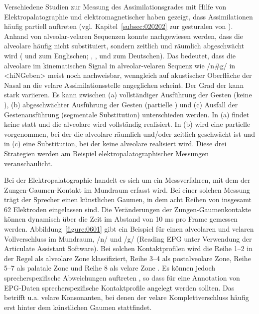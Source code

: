 Verschiedene Studien zur Messung des Assimilationsgrades mit Hilfe von Elektropalatographie und elektromagnetischer  haben gezeigt, dass Assimilationen häufig partiell auftreten (vgl. Kapitel~\ref{subsec:020202} zur gesturalen  von ). Anhand von alveolar-velaren Sequenzen konnte nachgewiesen werden, dass die alveolare  häufig nicht substituiert, sondern zeitlich und räumlich abgeschwächt wird (\citealt{Barry1991} und \citealt{Ellis2002} zum Englischen; 
\citealt{Kohler1995}, \citealt{Jaeger2007}, \citealt{Bergmann2008} und \citealt{Mücke2008c} zum Deutschen).
Das bedeutet, dass die alveolare  im kinematischen Signal in alveolar-velaren Sequenz wie /n\#g/ in <hiNGeben> meist noch nachweisbar, wenngleich auf akustischer Oberfläche der Nasal an die velare Assimilationsstelle angeglichen scheint. Der Grad der  kann stark variieren. Es kann zwischen (a) vollständiger Ausführung der Gesten (keine ), (b) abgeschwächter Ausführung der Gesten (partielle ) und (c) Ausfall der Gestenausführung (segmentale Substitution) unterschieden werden. In (a) findet keine  statt und die alveolare  wird vollständig realisiert. In (b) wird eine partielle  vorgenommen, bei der die alveolare  räumlich und/oder zeitlich geschwächt ist und in (c) eine Substitution, bei der keine alveolare  realisiert wird. Diese drei Strategien werden am Beispiel elektropalatographischer Messungen veranschaulicht.

Bei der Elektropalatographie handelt es sich um ein Messverfahren, mit dem der Zungen-Gaumen-Kontakt im Mundraum erfasst wird. Bei einer solchen Messung trägt der Sprecher einen künstlichen Gaumen, in dem acht Reihen von insgesamt 62 Elektroden eingelassen sind. Die Veränderungen der Zungen-Gaumen\-kontakte können dynamisch über die Zeit im Abstand von 10 ms pro Frame gemessen werden. Abbildung~\ref{figure:0601} gibt ein Beispiel für einen alveolaren und velaren Vollverschluss im Mundraum, /n/ und /g/ (Reading EPG unter Verwendung der Articulate Assistant\textsuperscript{\textcopyright} Software). Bei solchen Kontaktprofilen wird die 
Reihe 1--2 in der Regel als alveolare Zone klassifiziert, 
Reihe 3--4 als postalveolare Zone, 
Reihe 5--7 als palatale Zone und Reihe 8 als velare Zone \citep{Gibbon1999}. Es können jedoch sprecherspezifische Abweichungen auftreten \citep{Byrd1996b}, so dass für eine Annotation von EPG-Daten sprecherspezifische Kontaktprofile angelegt werden sollten. Das betrifft u.a. velare Konsonanten, bei denen der velare Komplettverschluss häufig erst hinter dem künstlichen Gaumen stattfindet. 


